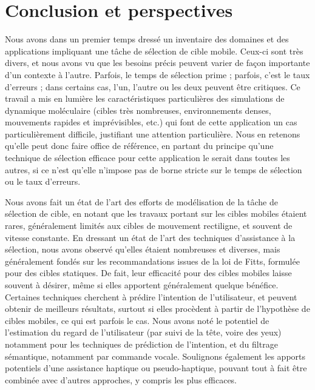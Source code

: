 


\chapter*{Conclusion et perspectives}


	Nous avons dans un premier temps dressé un inventaire des domaines et des applications impliquant une tâche de sélection de cible mobile. Ceux-ci sont très divers, et nous avons vu que les besoins précis peuvent varier de façon importante d'un contexte à l'autre. Parfois, le temps de sélection prime ; parfois, c'est le taux d'erreurs ; dans certains cas, l'un, l'autre ou les deux peuvent être critiques. Ce travail a mis en lumière les caractéristiques particulières des simulations de dynamique moléculaire (cibles très nombreuses, environnements denses, mouvements rapides et imprévisibles, etc.) qui font de cette application un cas particulièrement difficile, justifiant une attention particulière. Nous en retenons qu'elle peut donc faire office de référence, en partant du principe qu'une technique de sélection efficace pour cette application le serait dans toutes les autres, si ce n'est qu'elle n'impose pas de borne stricte sur le temps de sélection ou le taux d'erreurs.
	
	Nous avons fait un état de l'art des efforts de modélisation de la tâche de sélection de cible, en notant que les travaux portant sur les cibles mobiles étaient rares, généralement limités aux cibles de mouvement rectiligne, et souvent de vitesse constante. En dressant un état de l'art des techniques d'assistance à la sélection, nous avons observé qu'elles étaient nombreuses et diverses, mais généralement fondés sur les recommandations issues de la loi de Fitts, formulée pour des cibles statiques. De fait, leur efficacité pour des cibles mobiles laisse souvent à désirer, même si elles apportent généralement quelque bénéfice. Certaines techniques cherchent à prédire l'intention de l'utilisateur, et peuvent obtenir de meilleurs résultats, surtout si elles procèdent à partir de l'hypothèse de cibles mobiles, ce qui est parfois le cas. Nous avons noté le potentiel de l'estimation du regard de l'utilisateur (par suivi de la tête, voire des yeux) notamment pour les techniques de prédiction de l'intention, et du filtrage sémantique, notamment par commande vocale. Soulignons également les apports potentiels d'une assistance haptique ou pseudo-haptique, pouvant tout à fait être combinée avec d'autres approches, y compris les plus efficaces.
	
	